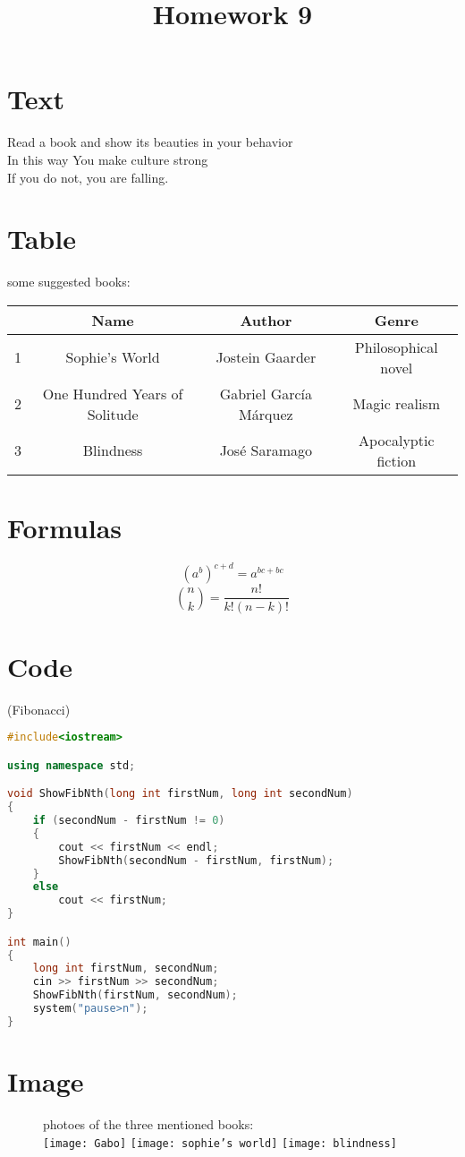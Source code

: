 \documentclass[12pt]{article}
\begin{document}
\title{Homework 9}
\maketitle
\section{Text}
Read a book and show its beauties in your behavior\\
In this way You make culture  strong\\
If you do not, you are falling.\\
\section{Table}
\begin{table}[h]
    \begin{center}
         some suggested books: \\
         \begin{tabular}{|c|c|c|c|}
           \hline
           \textbf{} & \textbf{Name} & \textbf{Author}&\textbf{Genre}\\
           \hline
           1 & Sophie's World & Jostein Gaarder & Philosophical novel \\
           \hline
           2 & One Hundred Years of Solitude & Gabriel García Márquez & Magic realism \\
           \hline
           3 & Blindness & José Saramago & Apocalyptic fiction \\
           \hline
        \end{tabular}
     \end{center}
\end{table}

\section{Formulas}
\[ (a^b)^{c+d} = a^{bc+bc}  \]
\[
    \binom{n}{k} = \frac{n!}{k!(n-k)!}
\]




\section{Code}
  (Fibonacci)\\
  \begin{lstlisting}[language=C++]
  #include<iostream>

using namespace std;

void ShowFibNth(long int firstNum, long int secondNum)
{
	if (secondNum - firstNum != 0)
	{
		cout << firstNum << endl;
		ShowFibNth(secondNum - firstNum, firstNum);
	}
	else
		cout << firstNum;
}

int main()
{
	long int firstNum, secondNum;
	cin >> firstNum >> secondNum;
	ShowFibNth(firstNum, secondNum);
	system("pause>n");
}
  \end{lstlisting}

\section{Image}
\begin{figure}
  \centering
  photoes of the three  mentioned books:\\
  \texttt{[image: Gabo]}
  \texttt{[image: sophie's world]}
  \texttt{[image: blindness]}
\end{figure}
\end{document}
